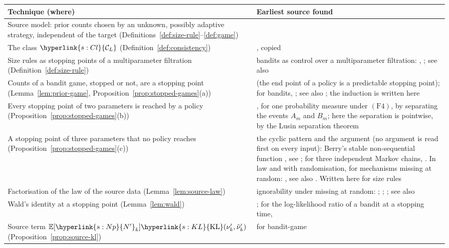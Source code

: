 \documentclass[11pt]{article}
\newcommand{\sy}[2]{\hyperlink{#1}{#2}}
\newcommand{\E}{\mathbb{E}}
\newcommand{\KL}{\sy{s:KL}{\mathrm{KL}}}
\newcommand{\ClL}[1][L]{\sy{s:Cl}{\mathcal{C}_{#1}}}
\newcommand{\Np}{\sy{s:Np}{N'}}
\begin{document}
\begin{center}
\begin{tabular}{@{}p{}p{}@{}}
\toprule
Technique (where) & Earliest source found \\
\midrule
Source model: prior counts chosen by an unknown, possibly adaptive strategy, independent of the
target (Definitions~\ref{def:size-rule}--\ref{def:game}) & \citet[Section~3.2]{PMRM26} \\
The class $\ClL$ (Definition~\ref{def:consistency}) & \citet[Section~4.2]{PMRM26}, copied \\
Size rules as stopping points of a multiparameter filtration (Definition~\ref{def:size-rule}) &
bandits as control over a multiparameter filtration: \citet{M86}, \citet{KM98}; see also
\citet{CW75} \\
Counts of a bandit game, stopped or not, are a stopping point (Lemma~\ref{lem:prior-game},
Proposition~\ref{prop:stopped-games}(a)) & \citet[Section~1.3]{MV81} (the end point of a policy is
a predictable stopping point); for bandits, \citet{KM98}; see also \citet{KS81}; the induction is
written here \\
Every stopping point of two parameters is reached by a policy (Proposition~\ref{prop:stopped-games}(b))
& \citet[Theorem~4]{MV81}, for one probability measure under $(\mathrm{F}4)$, by separating the
events $A_m$ and $B_m$; here the separation is pointwise, by the Lusin separation theorem
\citep[Theorem~14.7]{K95} \\
A stopping point of three parameters that no policy reaches (Proposition~\ref{prop:stopped-games}(c))
& the cyclic pattern and the argument (no argument is read first on every input): Berry's stable
non-sequential function \citep[Proposition~II.2.2]{Ber76}, see \citet{Cur03}; for three independent
Markov chains, \citet[Section~5.2]{MV81}. In law and with randomisation, for mechanisms missing at
random: \citet{RG97}, see also \citet{GR97}. Written here for size rules \\
Factorisation of the law of the source data (Lemma~\ref{lem:source-law}) & ignorability under
missing at random: \citet{R76}; \citet[Theorem~1]{SGJC13}; \citet[Theorem~1]{FDS18}; see also
\citet{BW88} \\
Wald's identity at a stopping point (Lemma~\ref{lem:wald}) & \citet{W44}; for the log-likelihood
ratio of a bandit at a stopping time, \citet[Appendix~A, (18)]{KCG16} \\
Source term $\E[\Np_k]\KL(\nu'_k,\tilde\nu'_k)$ (Proposition~\ref{prop:source-kl}) & for bandit-game

\end{tabular}
\end{center}
\end{document}

